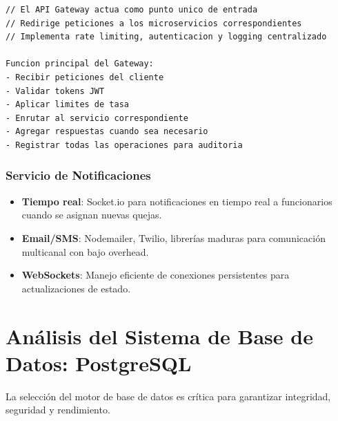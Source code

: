 \begin{lstlisting}[caption=Estructura conceptual de API Gateway]
// El API Gateway actua como punto unico de entrada
// Redirige peticiones a los microservicios correspondientes
// Implementa rate limiting, autenticacion y logging centralizado

Funcion principal del Gateway:
- Recibir peticiones del cliente
- Validar tokens JWT
- Aplicar limites de tasa
- Enrutar al servicio correspondiente
- Agregar respuestas cuando sea necesario
- Registrar todas las operaciones para auditoria
\end{lstlisting}

\subsubsection{Servicio de Notificaciones}

\begin{itemize}
    \item \textbf{Tiempo real}: Socket.io para notificaciones en tiempo real a funcionarios cuando se asignan nuevas quejas.
    
    \item \textbf{Email/SMS}: Nodemailer, Twilio, librerías maduras para comunicación multicanal con bajo overhead.
    
    \item \textbf{WebSockets}: Manejo eficiente de conexiones persistentes para actualizaciones de estado.
\end{itemize}

\section{Análisis del Sistema de Base de Datos: PostgreSQL}

La selección del motor de base de datos es crítica para garantizar integridad, seguridad y rendimiento.

